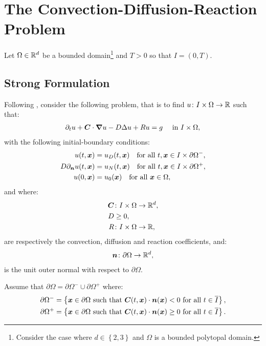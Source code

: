 \section{The Convection-Diffusion-Reaction Problem}

Let $\Omega \in \mathbb{R}^{d}$ be a bounded domain\footnote{Consider the case where $d \in \left\{ 2, 3 \right\}$ and $\Omega$ is a bounded polytopal domain.} and $T > 0$ so that $I = \left( 0, T\right)$.

\subsection{Strong Formulation}

Following \cite{Feistauer2007}, consider the following problem, that is to find $u \colon I \times \Omega \rightarrow \mathbb{R}$ such that:
\begin{gather}
    \partial_t u + \bm{C} \cdot \bm{\nabla} u - D \Delta u + R u = g \quad \text{ in } I \times \Omega, \label{equation:cdr}
\end{gather}
with the following initial-boundary conditions:
\begin{align}
    u(t, \bm{x}) &= u_D(t, \bm{x}) \quad \text{for all } t, \bm{x} \in I \times \partial \Omega^-, \label{equation:cdr_dirichlet} \\
    D \partial_{\bm{n}} u(t, \bm{x}) &= u_N(t, \bm{x}) \quad \text{for all } t, \bm{x} \in I \times \partial \Omega^+, \label{equation:cdr_neumann} \\
    u(0, \bm{x}) &= u_0(\bm{x}) \quad \text{for all } \bm{x} \in \Omega, \label{equation:cdr_initial}
\end{align}
and where:
\begin{align}
    \bm{C} & \colon I \times \Omega \rightarrow \mathbb{R}^{d}, \\
    D & \geq 0, \\
    R & \colon I \times \Omega \rightarrow \mathbb{R},
\end{align}
are respectively the convection, diffusion and reaction coefficients, and:
\begin{gather}
    \bm{n} \colon \partial \Omega \rightarrow \mathbb{R}^{d},
\end{gather}
is the unit outer normal with respect to $\partial \Omega$.

Assume that $\partial \Omega = \partial \Omega^- \cup \partial \Omega^+$ where:
\begin{align}
    \partial \Omega^- = \left\{ \bm{x} \in \partial \Omega \text{ such that } \bm{C}(t, \bm{x}) \cdot \bm{n}(\bm{x}) < 0 \text{ for all } t \in \overline{I} \right\}, \\
    \partial \Omega^+ = \left\{ \bm{x} \in \partial \Omega \text{ such that } \bm{C}(t, \bm{x}) \cdot \bm{n}(\bm{x}) \geq 0 \text{ for all } t \in \overline{I} \right\}.
\end{align}

